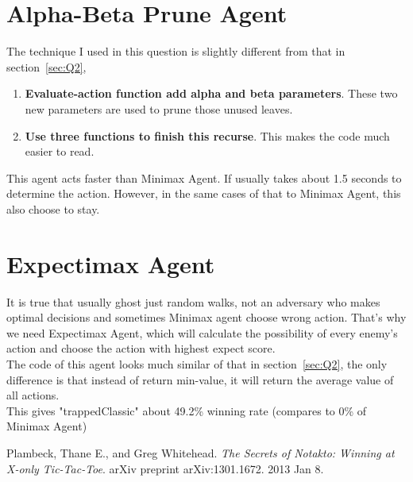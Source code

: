 \documentclass{article}
\begin{document}
	\section{Alpha-Beta Prune Agent}
	\label{sec:Q3}
	The technique I used in this question is slightly different from that in section~\ref{sec:Q2},
	\begin{enumerate}
		\item \textbf{Evaluate-action function add alpha and beta parameters}. These two new parameters are used to prune those unused leaves.
		\item \textbf{Use three functions to finish this recurse}. This makes the code much easier to read.
	\end{enumerate}
	This agent acts faster than Minimax Agent. If usually takes about 1.5 seconds to determine the action. However, in the same cases of that to Minimax Agent, this also choose to stay.
	\section{Expectimax Agent}
	\label{sec:Q4}
	It is true that usually ghost just random walks, not an adversary who makes optimal decisions and sometimes Minimax agent choose wrong action. That's why we need Expectimax Agent, which will calculate the possibility of every enemy's action and choose the action with highest expect score.\\
	The code of this agent looks much similar of that in section~\ref{sec:Q2}, the only difference is that instead of return min-value, it will return the average value of all actions.\\
	This gives "trappedClassic" about 49.2\% winning rate (compares to 0\% of Minimax Agent)
	\begin{thebibliography}{1}
		Plambeck, Thane E., and Greg Whitehead. 
		\textit{The Secrets of Notakto: Winning at X-only Tic-Tac-Toe}. 
		arXiv preprint arXiv:1301.1672. 2013 Jan 8.
	\end{thebibliography}
\end{document}
